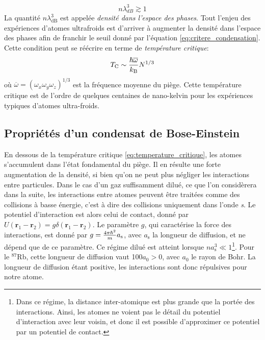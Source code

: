 \begin{equation}
n \lambda_{dB}^3 \gtrsim 1
\label{eq:critere_condensation}
\end{equation}
La quantité $n \lambda_{\mathrm{dB}}^3$ est appelée \emph{densité dans l'espace des phases}. Tout l'enjeu des expériences d'atomes ultrafroids est d'arriver à augmenter la densité dans l'espace des phases afin de franchir le seuil donné par l'équation \ref{eq:critere_condensation}. Cette condition peut se réécrire en terme de \emph{température critique}:
\begin{equation}
T_{\mathrm{C}}\sim \frac{\hslash \overline{\omega}}{k_{\mathrm{B}}}N^{1/3}
\label{eq:temperature_critique}
\end{equation}
où $\overline{\omega}=(\omega_x \omega_y \omega_z)^{1/3}$ est la fréquence moyenne du piège. Cette température critique est de l'ordre de quelques centaines de nano-kelvin pour les expériences typiques d'atomes ultra-froids.





\subsection{Propriétés d'un condensat de Bose-Einstein}
En dessous de la température critique \ref{eq:temperature_critique}, les atomes s'accumulent dans l'état fondamental du piège. Il en résulte une forte augmentation de la densité, si bien qu'on ne peut plus négliger les interactions entre particules. Dans le cas d'un gaz suffisamment dilué, ce que l'on considèrera dans la suite, les interactions entre atomes peuvent être traitées comme des collisions à basse énergie, c'est à dire des collisions uniquement dans l'onde \emph{s}. Le potentiel d'interaction est alors celui de contact, donné par $U(\mathbf{r}_1-\mathbf{r}_2)=g\delta(\mathbf{r}_1-\mathbf{r}_2)$. Le paramètre $g$, qui caractérise la force des interactions, est donné par $g=\frac{4 \pi \hslash^2}{m}a_{\mathrm{s}}$, avec $a_{\mathrm{s}}$ la longueur de diffusion, et ne dépend que de ce paramètre. Ce régime dilué est atteint lorsque $na_{\mathrm{s}}^3\ll 1$\footnote{Dans ce régime, la distance inter-atomique est plus grande que la portée des interactions. Ainsi, les atomes ne voient pas le détail du potentiel d'interaction avec leur voisin, et donc il est possible d'approximer ce potentiel par un potentiel de contact.}. Pour le ${}^{87}$Rb, cette longueur de diffusion vaut 100$a_{\mathrm{0}}>0$, avec $a_{\mathrm{0}}$ le rayon de Bohr. La longueur de diffusion étant positive, les interactions sont donc répulsives pour notre atome.

